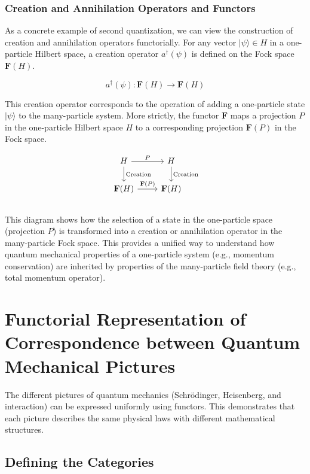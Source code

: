 \documentclass[uplatex,a4j,12pt,dvipdfmx]{jsarticle}
\begin{document}
\subsubsection{Creation and Annihilation Operators and Functors}

As a concrete example of second quantization, we can view the construction of creation and annihilation operators functorially. For any vector $|\psi\rangle \in H$ in a one-particle Hilbert space, a creation operator $a^\dagger(\psi)$ is defined on the Fock space $\mathbf{F}(H)$.

$$a^\dagger(\psi) : \mathbf{F}(H) \to \mathbf{F}(H)$$

This creation operator corresponds to the operation of adding a one-particle state $|\psi\rangle$ to the many-particle system. More strictly, the functor $\mathbf{F}$ maps a projection $P$ in the one-particle Hilbert space $H$ to a corresponding projection $\mathbf{F}(P)$ in the Fock space.

$$
	\begin{tikzcd}
		H \arrow[r, "P"] \arrow[d, "\text{Creation}"] & H \arrow[d, "\text{Creation}"] \\
		\mathbf{F}(H) \arrow[r, "\mathbf{F}(P)"] & \mathbf{F}(H)
	\end{tikzcd}
$$

${}$

This diagram shows how the selection of a state in the one-particle space (projection $P$) is transformed into a creation or annihilation operator in the many-particle Fock space. This provides a unified way to understand how quantum mechanical properties of a one-particle system (e.g., momentum conservation) are inherited by properties of the many-particle field theory (e.g., total momentum operator).






\section{Functorial Representation of Correspondence between Quantum Mechanical Pictures}

The different pictures of quantum mechanics (Schrödinger, Heisenberg, and interaction) can be expressed uniformly using functors. This demonstrates that each picture describes the same physical laws with different mathematical structures.

\subsection{Defining the Categories}
\end{document}
